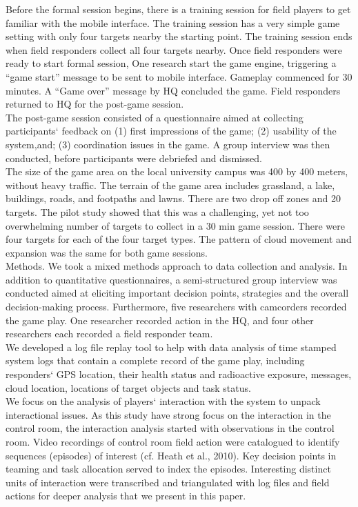 Before the formal session begins, there is a training session for field players to get familiar with the mobile interface. The training session has a very simple game setting with only four targets nearby the starting point. The training session ends when field responders collect all four targets nearby. Once field responders were ready to start formal session, One research start the game engine, triggering a ``game start'' message to be sent to mobile interface. Gameplay commenced for 30 minutes. A ``Game over'' message by HQ concluded the game. Field responders returned to HQ for the post-game session.\\

The post-game session consisted of a questionnaire aimed at collecting participants` feedback on (1) first impressions of the game; (2) usability of the system,and; (3) coordination issues in the game. A group interview was then conducted, before participants were debriefed and dismissed.\\

The size of the game area on the local university campus was 400 by 400 meters, without heavy traffic. The terrain of the game area includes grassland, a lake, buildings, roads, and footpaths and lawns. There are two drop off zones and 20 targets. The pilot study showed that this was a challenging, yet not too overwhelming number of targets to collect in a 30 min game session. There were four targets for each of the four target types. The pattern of cloud movement and expansion was the same for both game sessions.\\

Methods. We took a mixed methods approach to data collection and analysis. In addition to quantitative questionnaires, a semi-structured group interview was conducted aimed at eliciting important decision points, strategies and the overall decision-making process. Furthermore, five researchers with camcorders recorded the game play. One researcher recorded action in the HQ, and four other researchers each recorded a field responder team.\\

We developed a log file replay tool to help with data analysis of time stamped system logs that contain a complete record of the game play, including responders` GPS location, their health status and radioactive exposure, messages, cloud location, locations of target objects and task status.\\

We focus on the analysis of players` interaction with the system to unpack interactional issues. As this study have strong focus on the interaction in the control room, the interaction analysis started with observations in the control room. Video recordings of control room field action were catalogued to identify sequences (episodes) of interest (cf. Heath et al., 2010). Key decision points in teaming and task allocation served to index the episodes. Interesting distinct units of interaction were transcribed and triangulated with log files and field actions for deeper analysis that we present in this paper.\\



